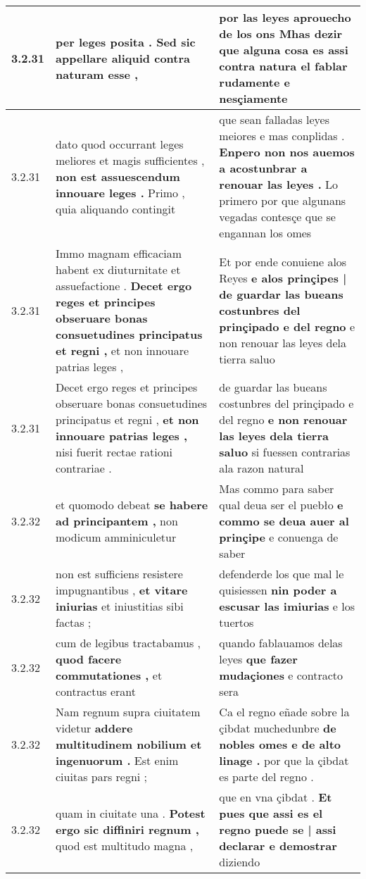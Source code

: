 \begin{tabular}{|p{1cm}|p{6.5cm}|p{6.5cm}|}
3.2.31 & per leges posita . \textbf{ Sed sic appellare aliquid } contra naturam esse , & por las leyes aprouecho de los ons \textbf{ Mhas dezir que alguna cosa es } assi contra natura el fablar rudamente e nesçiamente \\\hline
3.2.31 & dato quod occurrant leges meliores et magis sufficientes , \textbf{ non est assuescendum innouare leges . } Primo , quia aliquando contingit & que sean falladas leyes meiores e mas conplidas . \textbf{ Enpero non nos auemos a acostunbrar a renouar las leyes . } Lo primero por que algunans vegadas contesçe que se engannan los omes \\\hline
3.2.31 & Immo magnam efficaciam habent ex diuturnitate et assuefactione . \textbf{ Decet ergo reges et principes obseruare bonas consuetudines principatus et regni , } et non innouare patrias leges , & Et por ende conuiene alos Reyes \textbf{ e alos prinçipes | de guardar las bueans costunbres del prinçipado e del regno } e non renouar las leyes dela tierra saluo \\\hline
3.2.31 & Decet ergo reges et principes obseruare bonas consuetudines principatus et regni , \textbf{ et non innouare patrias leges , } nisi fuerit rectae rationi contrariae . & de guardar las bueans costunbres del prinçipado e del regno \textbf{ e non renouar las leyes dela tierra saluo } si fuessen contrarias ala razon natural \\\hline
3.2.32 & et quomodo debeat \textbf{ se habere ad principantem , } non modicum amminiculetur & Mas commo para saber qual deua ser el puebło \textbf{ e commo se deua auer al prinçipe } e conuenga de saber \\\hline
3.2.32 & non est sufficiens resistere impugnantibus , \textbf{ et vitare iniurias } et iniustitias sibi factas ; & defenderde los que mal le quisiessen \textbf{ nin poder a escusar las imiurias } e los tuertos \\\hline
3.2.32 & cum de legibus tractabamus , \textbf{ quod facere commutationes , } et contractus erant & quando fablauamos delas leyes \textbf{ que fazer mudaçiones } e contracto sera \\\hline
3.2.32 & Nam regnum supra ciuitatem videtur \textbf{ addere multitudinem nobilium et ingenuorum . } Est enim ciuitas pars regni ; & Ca el regno eñade sobre la çibdat muchedunbre \textbf{ de nobles omes e de alto linage . } por que la çibdat es parte del regno . \\\hline
3.2.32 & quam in ciuitate una . \textbf{ Potest ergo sic diffiniri regnum , } quod est multitudo magna , & que en vna çibdat . \textbf{ Et pues que assi es el regno puede se | assi declarar e demostrar } diziendo \\\hline

\end{tabular}
